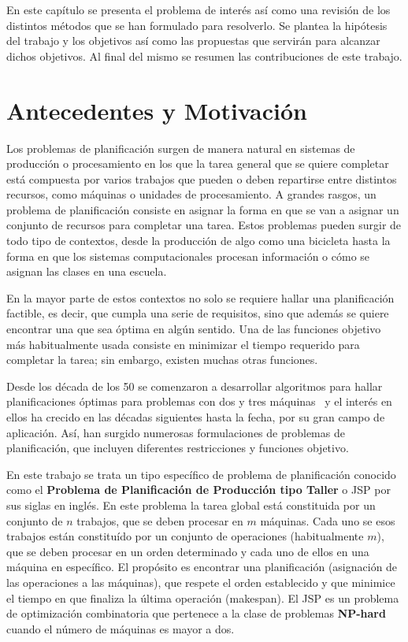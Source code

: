 En este capítulo se presenta el problema de interés así como una revisión de los distintos métodos que se han formulado para resolverlo. 
%
Se plantea la hipótesis del trabajo y los objetivos así como las propuestas que servirán para alcanzar dichos objetivos. 
%
Al final del mismo se resumen las contribuciones de este trabajo.

\section{Antecedentes y Motivación}
Los problemas de planificación surgen de manera natural en sistemas de producción o procesamiento en los que la tarea general que se 
quiere completar está compuesta por varios trabajos que pueden o deben repartirse entre distintos recursos, como máquinas o unidades de procesamiento. 
%
A grandes rasgos, un problema de planificación consiste en asignar la forma en que se van a asignar un conjunto de recursos para completar una
tarea.
%
Estos problemas pueden surgir de todo tipo de contextos, desde la producción de algo como una bicicleta hasta la forma en que los sistemas computacionales 
procesan información o cómo se asignan las clases en una escuela. 

En la mayor parte de estos contextos no solo se requiere hallar una planificación factible, es decir, que cumpla una serie de requisitos, sino que además se quiere 
encontrar una que sea óptima en algún sentido.
%
Una de las funciones objetivo más habitualmente usada consiste en minimizar el tiempo requerido para completar la tarea; sin embargo, existen muchas otras funciones.

Desde los década de los 50 se comenzaron a desarrollar algoritmos para hallar planificaciones óptimas para problemas con dos y tres máquinas~\cite{johnson1954optimal}
y el interés en ellos ha crecido en las décadas siguientes hasta la fecha, por su gran campo de aplicación.
%
Así, han surgido numerosas formulaciones de problemas de planificación, que incluyen diferentes restricciones y funciones objetivo.
 
En este trabajo se trata un tipo específico de problema de planificación conocido como el \textbf{Problema de Planificación de Producción tipo Taller} o JSP por sus 
siglas en inglés. 
%
En este problema la tarea global está constituida por un conjunto de $n$ trabajos, que se deben procesar en $m$ máquinas. 
%
Cada uno se esos trabajos están constituído por un conjunto de operaciones (habitualmente $m$), que se deben procesar en un orden determinado y cada uno de ellos
en una máquina en específico.
%
El propósito es encontrar una planificación (asignación de las operaciones a las máquinas), que respete el orden establecido y que minimice el tiempo en que finaliza
la última operación (makespan).
%
El JSP es un problema de optimización combinatoria que pertenece a la clase de problemas \textbf{NP-hard} cuando el número de máquinas es mayor a dos\cite{garey1976complexity}.

